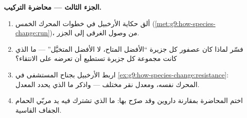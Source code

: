 \begin{problem}
\medskip\noindent\textbf{الجزء الثالث --- محاضرة
التركيب.}
\begin{enumerate}[resume]
  \item ألق حكاية الأرخبيل في خطوات المحرك الخمس
        (\cref{met:g9:how-species-change:run})، من وصول
        الغرقى إلى  الجزر.
  \item فسّر لماذا كان عصفور كل جزيرة ``الأفضل المتاح،
        لا الأفضل المتخيَّل'' --- ما الذي كانت مجموعة كل
        جزيرة تستطيع أن تعرضه على الانتقاء؟
  \item اربط الأرخبيل بجناح المستشفى في
        \cref{ex:g9:how-species-change:resistance}:
        المحرك نفسه، ومعدل نقر مختلف --- واذكر ما الذي
        يحدد المعدل.
  \item اختم المحاضرة بمقارنة داروين وقد صرّح بها: ما
        الذي تشترك فيه يد مربّي الحمام  الجفاف
        القاسية.
\end{enumerate}
\end{problem}
